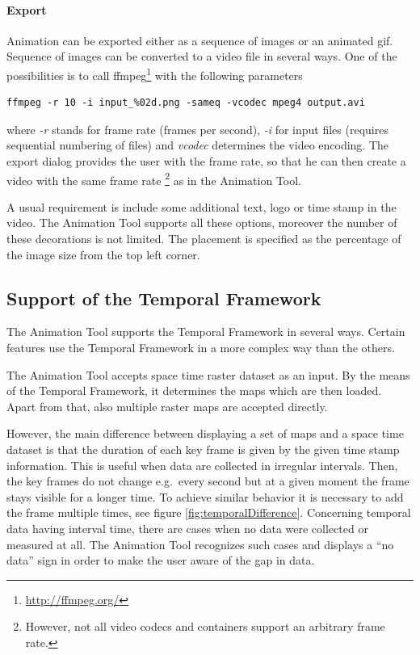 \documentclass[a4paper,12pt,oneside]{book}
\newcommand{\tf}{Temporal Framework\xspace}
\newcommand{\at}{Animation Tool\xspace}
\begin{document}
        
      
\paragraph{Export}
Animation can be exported either as a sequence of images or an animated gif.
Sequence of images can be converted to a video file in several ways.
One of the possibilities is to call ffmpeg\footnote{\url{http://ffmpeg.org/}} with the following parameters
      
\begin{footnotesize}
\begin{lstlisting}[style=mybash]
ffmpeg -r 10 -i input_%02d.png -sameq -vcodec mpeg4 output.avi
\end{lstlisting}
\end{footnotesize}
      where \emph{-r} stands for frame rate (frames per second),
      \emph{-i} for input files (requires sequential numbering of files) and
      \emph{vcodec} determines the video encoding.
      The export dialog provides the user with the frame rate, so that he can then create
      a video with the same frame rate%
      \footnote{However, not all video codecs and containers support an arbitrary frame rate.} as in the \at.

      A usual requirement is include some additional text, logo or time stamp in the video.
      The \at supports all these options, moreover the number of these decorations is not limited.
      The placement is specified as the percentage of the image size from the top left corner.
      

\subsection{Support of the \tf}
\label{sec:wx.animation:support}
The \at supports the \tf in several ways. Certain features use the \tf in a more complex way than the others.

The \at accepts space time raster dataset as an input. By the means of the \tf, it determines the maps which are then loaded.
Apart from that, also multiple raster maps are accepted directly.

However, the main difference between displaying a set of maps and a space time dataset is
that the duration of each key frame is given by the given time stamp information.
This is useful when data are collected in irregular intervals.
Then, the key frames do not change e.g.\ every second but at a given moment the frame stays visible for a longer time.
To achieve similar behavior it is necessary to add the frame multiple times, see figure \ref{fig:temporalDifference}.
Concerning temporal data having interval time, there are cases when no data were collected or measured at all.
The \at recognizes such cases and displays a ``no data'' sign in order to make the user aware of the gap in data.
\end{document}
